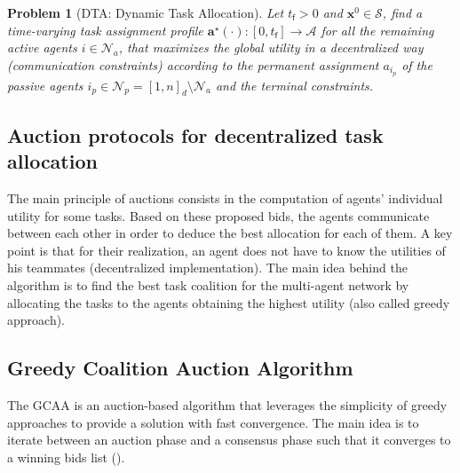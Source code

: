 \documentclass{ifacconf}
\newcommand{\f}{{\mathsf{f}}}
\newcommand{\cA}{\mathcal{A}}
\newcommand{\cN}{\mathcal{N}}
\newcommand{\cS}{\mathcal{S}}
\newtheorem{problem}{Problem}
\begin{document}
\begin{problem}[DTA: Dynamic Task Allocation]\label{problemRHTA}
Let $t_\f > 0$ and $\bm{x}^0 \in \cS$, find a time-varying task assignment profile $\bm{a}^{\star}(\cdot): [0,t_\f] \rightarrow \cA$ for all the remaining active agents $i \in \cN_a$, that maximizes the global utility in a decentralized way (communication constraints) according to the permanent assignment $a_{i_p}$ of the passive agents $i_p \in \cN_p = [1,n]_d \setminus \cN_a$ and the terminal constraints.
\end{problem}


\subsection{Auction protocols for decentralized task allocation}\label{ss:negotiate}
The main principle of auctions consists in the computation of agents' individual utility for some tasks. Based on these proposed bids, the agents communicate between each other in order to deduce the best allocation for each of them.
A key point is that for their realization, an agent does not have to know the utilities of his teammates (decentralized implementation). The main idea behind the algorithm is to find the best task coalition for the multi-agent network by allocating the tasks to the agents obtaining the highest utility (also called greedy approach).

\subsection{Greedy Coalition Auction Algorithm}

The GCAA is an auction-based algorithm that leverages the simplicity of greedy approaches to provide a solution with fast convergence. The main idea is to iterate between an auction phase and a consensus phase such that it converges to a winning bids list (\cite{p:howauction2009}).
\end{document}
